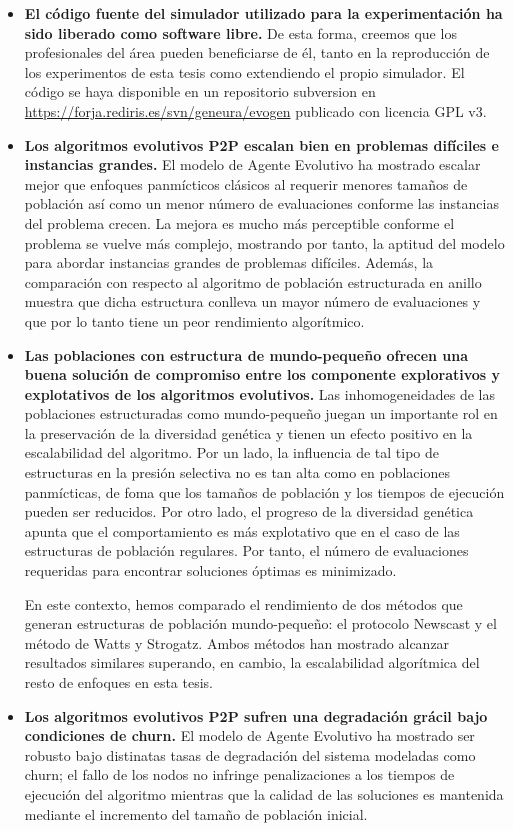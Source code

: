 \begin{itemize}
\item[] {\bf El c\'odigo fuente del simulador utilizado para la experimentaci\'on ha sido liberado como software libre.}
De esta forma, creemos que los profesionales del \'area pueden beneficiarse de \'el, tanto en la reproducci\'on de los experimentos de esta tesis como extendiendo el propio simulador. El c\'odigo se haya disponible en un repositorio subversion en  \url{https://forja.rediris.es/svn/geneura/evogen} publicado con licencia GPL v3.
 
\item[] {\bf Los algoritmos evolutivos P2P escalan bien en problemas dif\'iciles e instancias grandes.}
El modelo de Agente Evolutivo ha mostrado escalar mejor que enfoques panm\'icticos cl\'asicos al requerir menores tama\~nos de poblaci\'on as\'i como un menor n\'umero de evaluaciones conforme las instancias del problema crecen. La mejora es mucho m\'as perceptible conforme el problema se vuelve m\'as complejo, mostrando por tanto, la aptitud del modelo para abordar instancias grandes de problemas dif\'iciles. Adem\'as, la comparaci\'on con respecto al algoritmo de poblaci\'on estructurada en anillo muestra que dicha estructura conlleva un mayor n\'umero de evaluaciones y que por lo tanto tiene un peor rendimiento algor\'itmico.


\item[] {\bf Las poblaciones con estructura de mundo-peque\~no ofrecen una buena soluci\'on de compromiso entre los componente explorativos y explotativos de los algoritmos evolutivos.} Las inhomogeneidades de las poblaciones estructuradas como mundo-peque\~no juegan un importante rol en la preservaci\'on de la diversidad gen\'etica y tienen un efecto positivo en la escalabilidad del algoritmo. Por un lado, la influencia de tal tipo de estructuras en la presi\'on selectiva no es tan alta como en poblaciones panm\'icticas, de foma que los tama\~nos de poblaci\'on y los tiempos de ejecuci\'on pueden ser reducidos. Por otro lado, el progreso de la diversidad gen\'etica apunta que el comportamiento es m\'as explotativo que en el caso de las estructuras de poblaci\'on regulares. Por tanto, el n\'umero de evaluaciones requeridas para encontrar soluciones \'optimas es minimizado.

En este contexto, hemos comparado el rendimiento de dos m\'etodos que generan estructuras de poblaci\'on mundo-peque\~no: el protocolo Newscast y el m\'etodo de Watts y Strogatz. Ambos m\'etodos han mostrado alcanzar resultados similares superando, en cambio, la escalabilidad algor\'itmica del resto de enfoques en esta tesis.

\item[] {\bf Los algoritmos evolutivos P2P sufren una degradaci\'on gr\'acil bajo condiciones de churn.}
El modelo de Agente Evolutivo ha mostrado ser robusto bajo distinatas tasas de degradaci\'on del sistema modeladas como churn; el fallo de los nodos no infringe penalizaciones a los tiempos de ejecuci\'on del algoritmo mientras que la calidad de las soluciones es mantenida mediante el incremento del tama\~no de poblaci\'on inicial.

\end{itemize}


